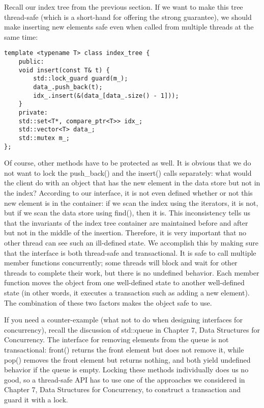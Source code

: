 Recall our index tree from the previous section. If we want to make this tree thread-safe (which is a short-hand for offering the strong guarantee), we should make inserting new elements safe even when called from multiple threads at the same time:

\begin{lstlisting}[style=styleCXX]
template <typename T> class index_tree {
	public:
	void insert(const T& t) {
		std::lock_guard guard(m_);
		data_.push_back(t);
		idx_.insert(&(data_[data_.size() - 1]));
	}
	private:
	std::set<T*, compare_ptr<T>> idx_;
	std::vector<T> data_;
	std::mutex m_;
};

\end{lstlisting}

Of course, other methods have to be protected as well. It is obvious that we do not want to lock the push\_back() and the insert() calls separately: what would the client do with an object that has the new element in the data store but not in the index? According to our interface, it is not even defined whether or not this new element is in the container: if we scan the index using the iterators, it is not, but if we scan the data store using find(), then it is. This inconsistency tells us that the invariants of the index tree container are maintained before and after but not in the middle of the insertion. Therefore, it is very important that no other thread can see such an ill-defined state. We accomplish this by making sure that the interface is both thread-safe and transactional. It is safe to call multiple member functions concurrently; some threads will block and wait for other threads to complete their work, but there is no undefined behavior. Each member function moves the object from one well-defined state to another well-defined state (in other words, it executes a transaction such as adding a new element). The combination of these two factors makes the object safe to use.

If you need a counter-example (what not to do when designing interfaces for concurrency), recall the discussion of std::queue in Chapter 7, Data Structures for Concurrency. The interface for removing elements from the queue is not transactional: front() returns the front element but does not remove it, while pop() removes the front element but returns nothing, and both yield undefined behavior if the queue is empty. Locking these methods individually does us no good, so a thread-safe API has to use one of the approaches we considered in Chapter 7, Data Structures for Concurrency, to construct a transaction and guard it with a lock.

